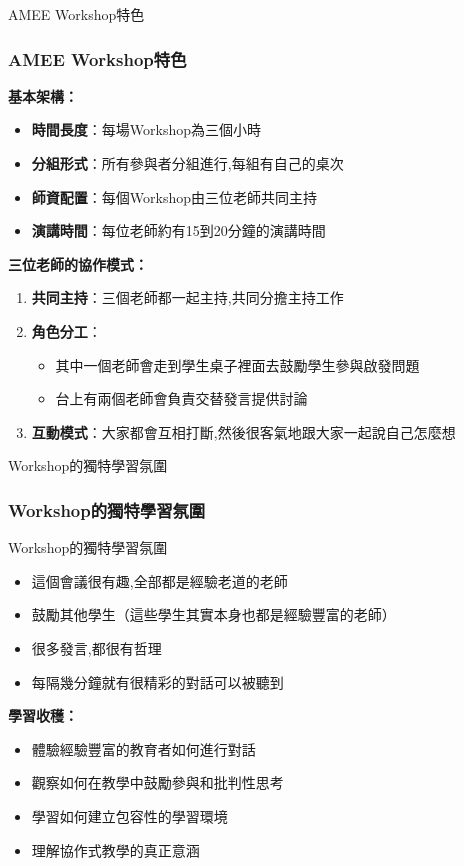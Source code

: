 \documentclass[aspectratio=169]{beamer}
\begin{document}
\begin{frame}{AMEE Workshop特色}
\frametitle{AMEE Workshop特色}

\textbf{基本架構：}
\begin{itemize}
    \item \textbf{時間長度}：每場Workshop為三個小時
    \item \textbf{分組形式}：所有參與者分組進行,每組有自己的桌次
    \item \textbf{師資配置}：每個Workshop由三位老師共同主持
    \item \textbf{演講時間}：每位老師約有15到20分鐘的演講時間
\end{itemize}

\vspace{0.5cm}

\textbf{三位老師的協作模式：}
\begin{enumerate}
    \item \textbf{共同主持}：三個老師都一起主持,共同分擔主持工作
    \item \textbf{角色分工}：
    \begin{itemize}
        \item 其中一個老師會走到學生桌子裡面去鼓勵學生參與啟發問題
        \item 台上有兩個老師會負責交替發言提供討論
    \end{itemize}
    \item \textbf{互動模式}：大家都會互相打斷,然後很客氣地跟大家一起說自己怎麼想
\end{enumerate}
\end{frame}

\begin{frame}{Workshop的獨特學習氛圍}
\frametitle{Workshop的獨特學習氛圍}

\begin{block}{Workshop的獨特學習氛圍}
\begin{itemize}
    \item 這個會議很有趣,全部都是經驗老道的老師
    \item 鼓勵其他學生（這些學生其實本身也都是經驗豐富的老師）
    \item 很多發言,都很有哲理
    \item 每隔幾分鐘就有很精彩的對話可以被聽到
\end{itemize}
\end{block}

\vspace{0.5cm}

\textbf{學習收穫：}
\begin{itemize}
    \item 體驗經驗豐富的教育者如何進行對話
    \item 觀察如何在教學中鼓勵參與和批判性思考
    \item 學習如何建立包容性的學習環境
    \item 理解協作式教學的真正意涵
\end{itemize}
\end{frame}
\end{document}
